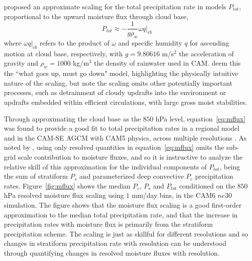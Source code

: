 \documentclass[alpha-refs]{wiley-article}
\begin{document}
\cite{RETAL2016CD} proposed an approximate scaling for the total precipitation rate in models $P_{tot}$, proportional to the upward moisture flux through cloud base,
\begin{equation}
P_{tot} \approx -\frac{1}{g\rho_{w}} \omega q |_{cb} \label{eq:mflux}
\end{equation}
where $\omega q |_{cb}$ refers to the product of $\omega$ and specific humidity $q$ for ascending motion at cloud base, respectively, with $g=9.80616$ m/s$^2$ the acceleration of gravity and $\rho_w=1000$ kg/m$^3$ the density of rainwater used in CAM. \cite{OETAL2016JAMES} deem this the ``what goes up, must go down" model, highlighting the physically intuitive nature of the scaling, but note the scaling omits other potentially important processes, such as detrainment of cloudy updrafts into the environment or updrafts embedded within efficient circulations, with large gross moist stabilities.

Through approximating the cloud base as the $850$ hPa level, equation~\ref{eq:mflux} was found to provide a good fit to total precipitation rates in a regional model \citep{RETAL2016CD} and in the CAM-SE AGCM with CAM5 physics, across multiple resolutions \citep[recall that CAM-SE is different from CAM-SE-CSLAM, used in this study;][]{OETAL2016JAMES}. As noted by \cite{RETAL2016CD}, using only resolved quantities in equation~\ref{eq:mflux} omits the sub-grid scale contribution to moisture fluxes, and so it is instructive to analyze the relative skill of this approximation for the individual components of $P_{tot}$, being the sum of stratiform $P_s$ and parameterized deep convective $P_c$ precipitation rates. Figure~\ref{fig:mflux} shows the median $P_c$, $P_s$ and $P_{tot}$ conditioned on the $850$ hPa resolved moisture flux scaling using $1$ mm/day bins, in the CAM6 $ne30$ simulation. The figure shows that the moisture flux scaling is a good first-order approximation to the median total precipitation rate, and that the increase in precipitation rates with moisture flux is primarily from the stratiform precipitation scheme. The scaling is just as skillful for different resolutions \citep[not shown;][]{OETAL2016JAMES} and so changes in stratiform precipitation rate with resolution can be understood through quantifying changes in resolved moisture fluxes with resolution.
\end{document}
